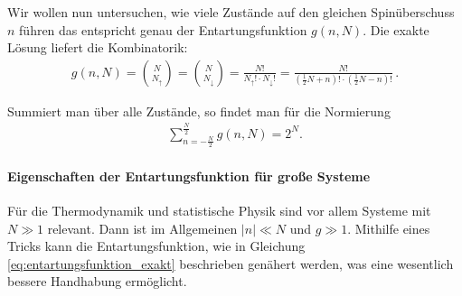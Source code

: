 Wir wollen nun untersuchen, wie viele Zustände auf den gleichen Spinüberschuss $n$ führen \textendash{} das entspricht genau der Entartungsfunktion $g(n,N)$. Die exakte Lösung liefert die Kombinatorik:
\begin{align}
    \label{eq:entartungsfunktion_exakt}
    g(n,N) = \binom{N}{N_\uparrow} = \binom{N}{N_\downarrow} = \frac{N!}{N_\uparrow!\cdot N_\downarrow!} = \frac{N!}{\left(\frac{1}{2}N+n\right)!\cdot \left( \frac{1}{2}N-n \right)!}\,.
\end{align}

Summiert man über alle Zustände, so findet man für die Normierung 
\begin{align*}
    \sum_{n=-\frac{N}{2}}^{\frac{N}{2}}g(n,N) = 2^N. 
\end{align*}


\paragraph*{Eigenschaften der Entartungsfunktion für große Systeme}

Für die Thermodynamik und statistische Physik sind vor allem Systeme mit $N\gg 1$ relevant. Dann ist im Allgemeinen $|n|\ll N$ und $g\gg 1$. Mithilfe eines Tricks kann die Entartungsfunktion, wie in Gleichung \eqref{eq:entartungsfunktion_exakt} beschrieben genähert werden, was eine wesentlich bessere Handhabung ermöglicht.

